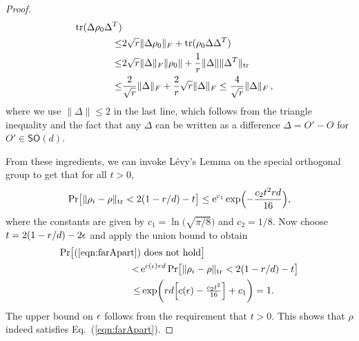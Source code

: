 \begin{proof}
\begin{align*}
\begin{split}
		\mathrm{tr}(\Delta \rho_0 \Delta^T) \\
		\leq& 
		2\sqrt r \|\Delta \rho_0\|_F + \mathrm{tr}(\rho_0 \Delta \Delta^T) \\
		\leq& 
		2\sqrt r \|\Delta\|_F \|\rho_0\| + \frac{1}{r} \|\Delta\| \|\Delta^T\|_{\mathrm{tr}}  \\
		\leq &
		\frac{2}{\sqrt r} \|\Delta\|_F + \frac{2}{r} \sqrt{r} \|\Delta\|_F
		\leq 
		\frac4{\sqrt r} \|\Delta\|_F \,,
	\end{split}
	\end{align*}
	where we use $\|\Delta\| \le 2$ in the last line, which follows from the triangle inequality and the fact that any $\Delta$ can be written as a difference $\Delta = O'-O$ for $O' \in \mathsf{SO}(d)$.
	
	From these ingredients, we can invoke L\'evy's Lemma on the special orthogonal group \cite[Theorem 6.5.1]{Milman1986} to get that for all $t>0$,
	\begin{align*}
		\Pr\bigl[ \| \rho_i - \rho \|_{\mathrm{tr}} < 2(1-r/d)- t \bigr]
		\leq
		\mathrm{e}^{c_1} \exp\Bigl(- \frac{c_2 t^2 rd}{16}\Bigr),
	\end{align*}
	where the constants are given by $c_1 = \ln\bigl(\sqrt{\pi/8}\bigr)$ and $c_2 = 1/8$.
	Now choose $t = 2(1-r/d) - 2\epsilon$ and apply the union bound to obtain
	\begin{align*}
		\Pr\bigl[ (\ref{eqn:farApart}) & \text{ does not hold}\bigr] \\ 
		<\, & \mathrm{e}^{c(\epsilon) rd} \Pr\bigl[ \| \rho_i - \rho \|_{\mathrm{tr}} < 2(1-r/d)- t  \bigr]\\
		\leq & \exp\mathclose{}\bigg(rd\Bigl[c(\epsilon)-\tfrac{c_2 t^2 }{16}\Big]+ c_1\bigg)=1.
	\end{align*}
	The upper bound on $\epsilon$ follows from the requirement that $t > 0$. This shows that $\rho$ indeed satisfies Eq.~(\ref{eqn:farApart}).


\end{proof}
